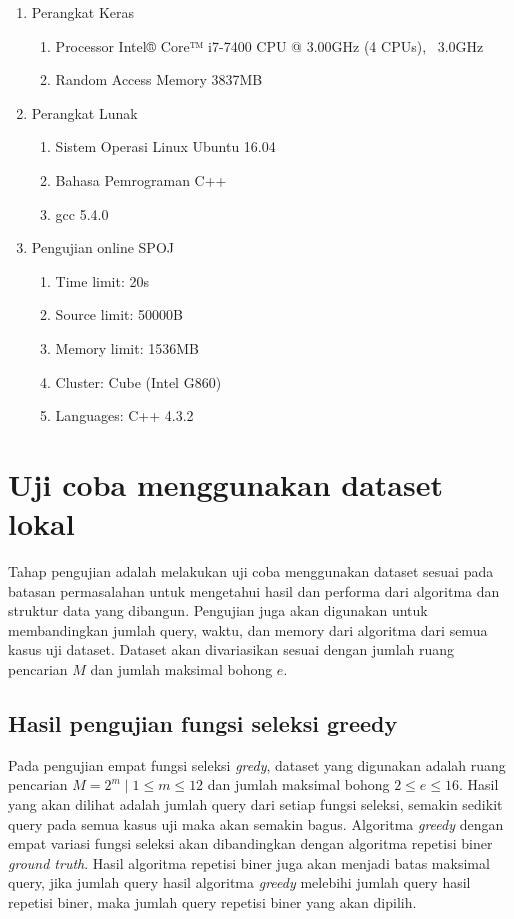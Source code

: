 \begin{enumerate}
  \item Perangkat Keras
  \begin{enumerate}
    \item Processor Intel® Core™ i7-7400 CPU @ 3.00GHz (4 CPUs), ~3.0GHz
    \item Random Access Memory 3837MB
  \end{enumerate}
  \item Perangkat Lunak
  \begin{enumerate}
    \item Sistem Operasi Linux Ubuntu 16.04
    \item Bahasa Pemrograman C++
    \item gcc 5.4.0
  \end{enumerate}
  \item Pengujian online SPOJ
  \begin{enumerate}
    \item Time limit: 20s
    \item Source limit: 50000B
    \item Memory limit: 1536MB
    \item Cluster: Cube (Intel G860)
    \item Languages: C++ 4.3.2
  \end{enumerate}
\end{enumerate}

\section{Uji coba menggunakan dataset lokal}

Tahap pengujian adalah melakukan uji coba menggunakan dataset sesuai pada batasan permasalahan untuk mengetahui hasil dan performa dari algoritma dan struktur data yang dibangun. Pengujian juga akan digunakan untuk membandingkan jumlah query, waktu, dan memory dari algoritma dari semua kasus uji dataset. Dataset akan divariasikan sesuai dengan jumlah ruang pencarian $M$ dan jumlah maksimal bohong $e$.

\subsection{Hasil pengujian fungsi seleksi greedy}

Pada pengujian empat fungsi seleksi \textit{gredy}, dataset yang digunakan adalah ruang pencarian $M=2^m \mid 1 \leq m \leq 12$ dan jumlah maksimal bohong $2 \leq e \leq 16$. Hasil yang akan dilihat adalah jumlah query dari setiap fungsi seleksi, semakin sedikit query pada semua kasus uji maka akan semakin bagus. Algoritma \textit{greedy} dengan empat variasi fungsi seleksi akan dibandingkan dengan algoritma repetisi biner \textit{ground truth}. Hasil algoritma repetisi biner juga akan menjadi batas maksimal query, jika jumlah query hasil algoritma \textit{greedy} melebihi jumlah query hasil repetisi biner, maka jumlah query repetisi biner yang akan dipilih.

